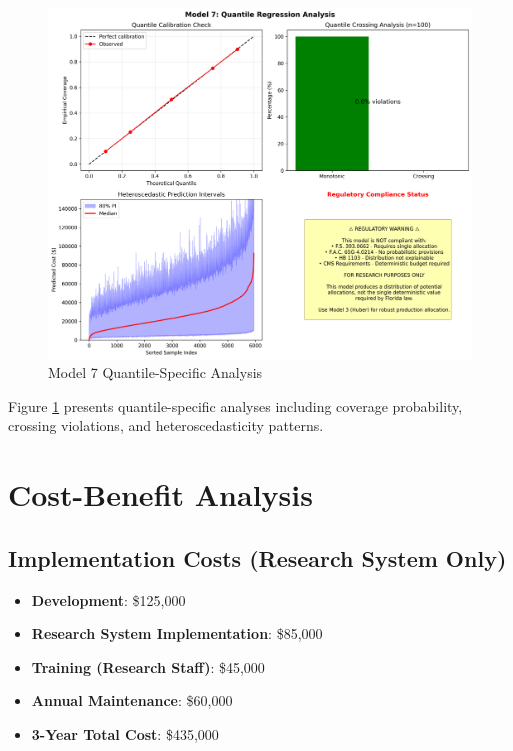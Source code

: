 \begin{figure}[h!]
\centering
\includegraphics[width=\textwidth]{models/model_7/quantile_analysis.png}
\caption{Model 7 Quantile-Specific Analysis}
\label{fig:model7_quantile_analysis}
\end{figure}

Figure \ref{fig:model7_quantile_analysis} presents quantile-specific analyses including coverage probability, crossing violations, and heteroscedasticity patterns.

\section{Cost-Benefit Analysis}

\subsection{Implementation Costs (Research System Only)}

\begin{itemize}
    \item \textbf{Development}: \$125,000
    \item \textbf{Research System Implementation}: \$85,000
    \item \textbf{Training (Research Staff)}: \$45,000
    \item \textbf{Annual Maintenance}: \$60,000
    \item \textbf{3-Year Total Cost}: \$435,000
\end{itemize}

